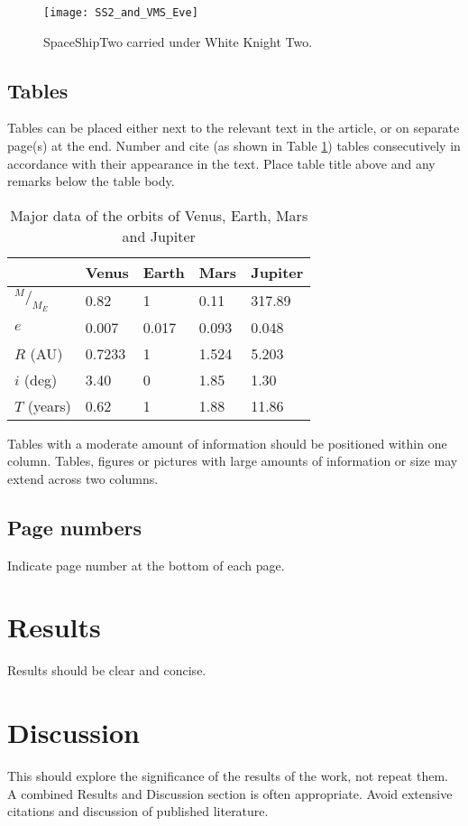 \documentclass[]{iac}
\newcommand*\rfrac[2]{{{}^{#1}\!/_{#2}}} %
\begin{document}
\begin{figure}[htbp]
    \centering
    \texttt{[image: SS2\_and\_VMS\_Eve]}
    \caption{SpaceShipTwo carried under White Knight Two.}
    \label{fig:ss2}
\end{figure}


\subsection{Tables}
Tables can be placed either next to the relevant text in the article, or on separate page(s) at the end. Number and cite (as shown in Table \ref{tab:orbitdata}) tables consecutively in accordance with their appearance in the text. Place table title above and any remarks below the table body.

\begin{table}[htbp]
    \centering
    \caption{Major data of the orbits of Venus, Earth, Mars and Jupiter}
    \begin{tabular}{lllll}
        \toprule
        & Venus & Earth & Mars & Jupiter \\
        \midrule
        $\rfrac{M}{M_E}$	& 0.82 		& 1 		& 0.11 		& 317.89	\\
        $e$					& 0.007		& 0.017		& 0.093		& 0.048		\\
        $R$ (AU)			& 0.7233	& 1			& 1.524		& 5.203		\\
        $i$ (deg)			& 3.40		& 0			& 1.85		& 1.30		\\
        $T$ (years)			& 0.62		& 1			& 1.88		& 11.86		\\
        \bottomrule
    \end{tabular}
    \label{tab:orbitdata}
\end{table}

Tables with a moderate amount of information should be positioned within one column. Tables, figures or pictures with large amounts of information or size may extend across two columns.


\subsection{Page numbers}
Indicate page number at the bottom of each page.

\section{Results}
Results should be clear and concise.

\section{Discussion}
This should explore the significance of the results of the work, not repeat them. A combined Results and Discussion section is often appropriate. Avoid extensive citations and discussion of published literature.
\end{document}
